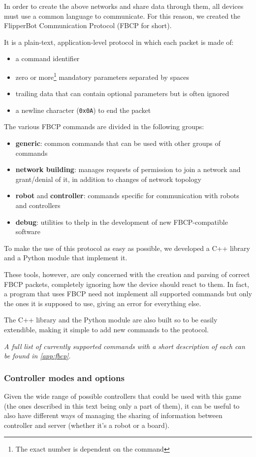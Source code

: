 In order to create the above networks and share data through them,
all devices must use a common language to communicate.
For this reason, we created the FlipperBot Communication Protocol
(FBCP for short).

\beforelist It is a plain-text, application-level protocol in which each packet
is made of:
\begin{itemize}
  \item a command identifier
  \item zero or more\footnote{The exact number is dependent on the
    command} mandatory parameters separated by spaces
  \item trailing data that can contain optional parameters but is
    often ignored
  \item a newline character (\texttt{0x0A}) to end the packet
\end{itemize}
\afterlist*
\beforelist The various FBCP commands are divided in the following groups:
\begin{itemize}
  \item \textbf{generic}: common commands that can be used with
    other groups of commands
  \item \textbf{network building}: manages requests of permission to
    join a network and grant/denial of it, in addition to changes of
    network topology
  \item \textbf{robot} and \textbf{controller}: commands specific
    for communication with robots and controllers
  \item \textbf{debug}: utilities to thelp in the development of new
    FBCP-compatible software
\end{itemize}
\afterlist*
To make the use of this protocol as easy as possible, we developed
a C++ library and a Python module that implement it.

These tools, however, are only concerned with the creation and
parsing of correct FBCP packets, completely ignoring how the device
should react to them. In fact, a program that uses FBCP need not
implement all supported commands but only the ones it is supposed to
use, giving an error for everything else.

The C++ library and the Python module are also built so to be easily
extendible, making it simple to add new commands to the protocol.

\textit{A full list of currently supported commands with a short
description of each can be found in \autoref{app:fbcp}.}

\subsubsection{Controller modes and options}
  \label{sssec:optmode}
  Given the wide range of possible controllers that could be used
  with this game (the ones described in this text being only a part
  of them), it can be useful to also have different ways of managing
  the sharing of information between controller and server (whether
  it's a robot or a board).

